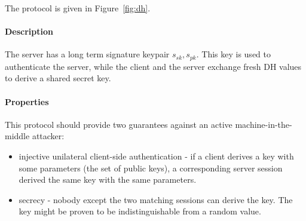\documentclass{article}
\newcommand{\sfsk}{\mathit{sk}}
\newcommand{\sfpk}{\mathit{pk}}
\begin{document}
The protocol is given in Figure~\ref{fig:dh}.

 \paragraph{Description} The server has a long term signature keypair $s_\sfsk,s_\sfpk$.
This key is used to authenticate the server, while the client and the server exchange fresh DH values to derive a shared secret key.

\paragraph{Properties} This protocol should provide two guarantees against an active machine-in-the-middle attacker:
\begin{itemize}
\item injective unilateral client-side authentication - if a client derives a key with some parameters (the set of public keys), a corresponding server session derived the same key with the same parameters.
\item secrecy - nobody except the two matching sessions can derive the key.  The key might be proven to be indistinguishable from a random value.
\end{itemize}
\end{document}
